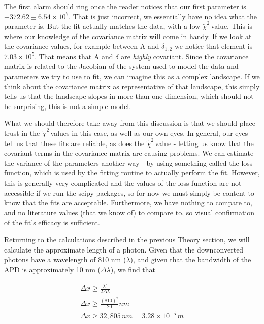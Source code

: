 \documentclass{article}
\newcommand{\redchi}{$\tilde{\chi}^2\,$}
\begin{document}
\hspace{.25cm}

The first alarm should ring once the reader notices that our first parameter is $-372.62 \pm 6.54 \times 10^7$.  That is just incorrect, we essentially have no idea what the parameter is.  But the fit actually matches the data, with a low \redchi value.  This is where our knowledge of the covariance matrix will come in handy.  If we look at the covariance values, for example between A and $\delta_{1,2}$ we notice that element is $7.03 \times 10^5$.  That means that A and $\delta$ are \emph{highly} covariant.  Since the covariance matrix is related to the Jacobian of the system used to model the data and parameters we try to use to fit, we can imagine this as a complex landscape.  If we think about the covariance matrix as representative of that landscape, this simply tells us that the landscape slopes in more than one dimension, which should not be surprising, this is not a simple model.

\hspace{.25cm}

What we should therefore take away from this discussion is that we should place trust in the \redchi values in this case, as well as our own eyes.  In general, our eyes tell us that these fits are reliable, as does the \redchi value - letting us know that the covariant terms in the covariance matrix are causing problems.  We can estimate the variance of the parameters another way - by using something called the loss function, which is used by the fitting routine to actually perform the fit.  However, this is generally very complicated and the values of the loss function are not accessible if we run the scipy packages, so for now we must simply be content to know that the fits are acceptable.  Furthermore, we have nothing to compare to, and no literature values (that we know of) to compare to, so visual confirmation of the fit's efficacy is sufficient.

\hspace{.5cm}

Returning to the calculations described in the previous Theory section, we will calculate the approximate length of a photon.  Given that the downconverted photons have a wavelength of 810 nm ($\lambda$), and given that the bandwidth of the APD is approximately 10 nm ($\Delta \lambda$), we find that

\begin{gather}
	\Delta x \geq \frac{\lambda^2}{2\Delta \lambda} \\
	\Delta x \geq \frac{(810)^2}{20} nm \\
	\Delta x \geq 32,805 \, nm = 3.28 \times 10^{-5} \, m
\end{gather}
\end{document}
